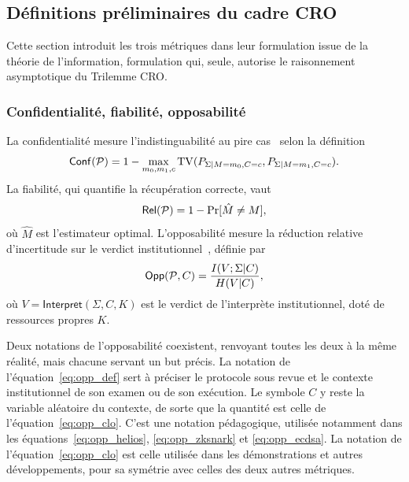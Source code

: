 \subsection{D\'efinitions pr\'eliminaires du cadre CRO}
\label{subsec:definitions_preliminaires_cro}
\begin{sloppypar}
Cette section introduit les trois
m\'etriques dans leur formulation issue de la th\'eorie de l'information, formulation qui,
seule, autorise le raisonnement asymptotique du Trilemme CRO.

\subsubsection{Confidentialit\'e, fiabilit\'e, opposabilit\'e}
\label{subsubsec:definitions_preliminaires}

La confidentialit\'e mesure l'indistinguabilit\'e au pire cas~\cite{GoldwasserMicali84} selon la d\'efinition
\begin{equation}
\mathsf{Conf}(\mathcal{P}) = 1 - \max_{m_0,m_1,c} \operatorname{TV}(P_{\Sigma|M=m_0,C=c},
P_{\Sigma|M=m_1,C=c}).
\label{eq:conf_def}
\end{equation}
La fiabilit\'e, qui quantifie la r\'ecup\'eration correcte, vaut
\begin{equation}
\mathsf{Rel}(\mathcal{P}) = 1 - \Pr[\hat{M} \neq M],
\label{eq:rel_def}
\end{equation}
o\`u $\hat{M}$ est l'estimateur optimal. L'opposabilit\'e mesure la
r\'eduction relative d'incertitude sur le verdict institutionnel~\cite{MINKA2026CLO}, d\'efinie par
\begin{equation}
\mathsf{Opp}(\mathcal{P}, C) = \frac{I(V;\Sigma|C)}{H(V|C)},
\label{eq:opp_def}
\end{equation}
o\`u $V = \mathsf{Interpret}(\Sigma, C, K)$ est le verdict de
l'interpr\`ete institutionnel, dot\'e de ressources propres $K$.

\begin{remark}\label{rem:deux_notations}
Deux notations de l'opposabilit\'e coexistent, renvoyant toutes les deux \`a la m\^eme r\'ealit\'e, mais chacune servant un but pr\'ecis.
La notation de l'\'equation~\eqref{eq:opp_def} sert \`a pr\'eciser le protocole sous revue et le contexte institutionnel de son examen ou de son ex\'ecution. Le symbole $C$ y reste la variable al\'eatoire du contexte, de sorte que la quantit\'e est celle de l'\'equation~\eqref{eq:opp_clo}. C'est une notation p\'edagogique, utilis\'ee notamment dans les \'equations~\eqref{eq:opp_helios}, \eqref{eq:opp_zksnark} et \eqref{eq:opp_ecdsa}.
La notation de l'\'equation~\eqref{eq:opp_clo} est celle utilis\'ee dans les d\'emonstrations et autres d\'eveloppements, pour sa sym\'etrie avec celles des deux autres m\'etriques.
\end{remark}


\end{sloppypar}
